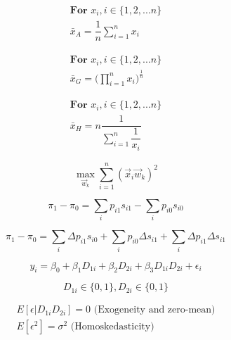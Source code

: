\documentclass[12pt]{amsart}
\title{}
\author{}
\date{} %
\begin{document}
\begin{equation}
\begin{split}
\textbf{For } x_i,i \in \{1,2,...n\} \\
\bar{x}_A=\dfrac{1}{n}\sum_{i=1}^n x_i
\end{split}
\end{equation}


\begin{equation}
\begin{split}
\textbf{For } x_i, i \in \{1,2,...n\} \\
\bar{x}_G=\Big(\prod_{i=1}^n x_i\Big)^{\frac{1}{n}}
\end{split}
\end{equation}

\begin{equation}
\begin{split}
\textbf{For } x_i, i \in \{1,2,...n\} \\
\bar{x}_H = n\dfrac{1}{\sum_{i=1}^n \dfrac{1}{x_i}}
\end{split}
\end{equation}

\begin{equation}
\max_{\vec{w}_k}\sum_{i=1}^n(\vec{x}_i\vec{w}_k)^2
\end{equation}

\begin{equation}
\pi_1-\pi_0=\sum_i p_{i1}s_{i1}-\sum_i p_{i0}s_{i0}
\end{equation}

\begin{equation}
\pi_1-\pi_0=\sum_i \Delta p_{i1}s_{i0} + \sum_i p_{i0}\Delta s_{i1} + \sum_i \Delta p_{i1}\Delta s_{i1}
\end{equation}




\begin{equation}
y_i=\beta_0+\beta_1 D_{1i} + \beta_2 D_{2i} + \beta_3 D_{1i}D_{2i} + \epsilon_i
\end{equation}

\begin{equation}
D_{1i} \in \{0,1\}, D_{2i} \in \{0,1\}
\end{equation}

\begin{equation}
\begin{split}
E[\epsilon | D_{1i} D_{2i}] =0 \text{  (Exogeneity and zero-mean)} \\
E[\epsilon^2] = \sigma^2 \text{  (Homoskedasticity)}\\
\end{split}
\end{equation}
\end{document}
